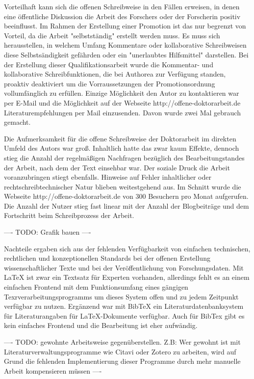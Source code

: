 Vorteilhaft kann sich die offenen Schreibweise in den Fällen erweisen, in denen eine öffentliche Diskussion die Arbeit des Forschers oder der Forscherin positiv beeinflusst. Im Rahmen der Erstellung einer Promotion ist das nur begrenzt von Vorteil, da die Arbeit "selbstständig" erstellt werden muss. Es muss sich herausstellen, in welchem Umfang Kommentare oder kollaborative Schreibweisen diese Selbstsändigkeit gefährden oder ein "unerlaubtes Hilfsmittel" darstellen. Bei der Erstellung dieser Qualifikationsarbeit wurde die Kommentar- und kollaborative Schreibfunktionen, die bei Authorea zur Verfügung standen, proaktiv deaktiviert um die Vorraussetzungen der Promotionsordnung vollumfänglich zu erfüllen. Einzige Möglichkeit den Autor zu kontaktieren war per E-Mail und die Möglichkeit auf der Webseite http://offene-doktorarbeit.de Literaturempfehlungen per Mail einzusenden. Davon wurde zwei Mal gebrauch gemacht.

Die Aufmerksamkeit für die offene Schreibweise der Doktorarbeit im direkten Umfeld des Autors war groß. Inhaltlich hatte das zwar kaum Effekte, dennoch stieg die Anzahl der regelmäßigen Nachfragen bezüglich des Bearbeitungstandes der Arbeit, nach dem der Text einsehbar war. Der soziale Druck die Arbeit voranzubringen stiegt ebenfalls. Hinweise auf Fehler inhaltlicher oder rechtschreibtechnischer Natur blieben weitestgehend aus. Im Schnitt wurde die Webseite http://offene-doktorarbeit.de von 300 Besuchern pro Monat aufgerufen. Die Anzahl der Nutzer stieg fast linear mit der Anzahl der Blogbeiträge und dem Fortschritt beim Schreibprozess der Arbeit.

---- TODO: Grafik bauen ----

Nachteile ergaben sich aus der fehlenden Verfügbarkeit von einfachen technischen, rechtlichen und konzeptionellen Standards bei der offenen Erstellung wissenschaftlicher Texte und bei der Veröffentlichung von Forschungsdaten. Mit LaTeX ist zwar ein Textsatz für Experten vorhanden, allerdings fehlt es an einem einfachen Frontend mit dem Funktionsumfang eines gängigen Texrverarbeitungsprogramms um dieses System offen und zu jedem Zeitpunkt verfügbar zu nutzen. Ergänzend war mit BibTeX ein Literaturdatenbanksystem für Literaturangaben für LaTeX-Dokumente verfügbar. Auch für BibTex gibt es kein einfaches Frontend und die Bearbeitung ist eher aufwändig.

---- TODO: gewohnte Arbeitsweise gegenüberstellen. Z.B: Wer gewohnt ist mit Literaturverwaltungsprogramme wie Citavi oder Zotero zu arbeiten, wird auf Grund die fehlenden Implementierung dieser Programme  durch mehr manuelle Arbeit kompensieren müssen ----

